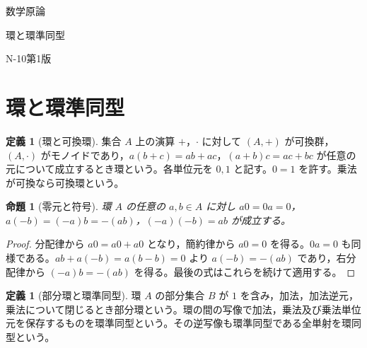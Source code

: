 \documentclass[a5paper,10pt,dvipdfmx]{jsarticle}
\theoremstyle{definition}
\newtheorem{defn}[ruledef]{定義}
\theoremstyle{plain}
\newtheorem{prop}[ruledef]{命題}
\begin{document}
\begin{center}
{\small 数学原論}\par\vspace{4mm}
{\LARGE 環と環準同型}\par\vspace{2mm}
{\small N-10\quad 第1版}
\end{center}
\section{環と環準同型}
\begin{defn}[環と可換環]\label{k249}
集合 $A$ 上の演算 $+$，$\cdot$ に対して $(A,+)$ が可換群，$(A,\cdot)$ がモノイドであり，$a(b+c)=ab+ac$，$(a+b)c=ac+bc$ が任意の元について成立するとき環という。各単位元を $0,1$ と記す。$0=1$ を許す。乗法が可換なら可換環という。
\end{defn}
\begin{prop}[零元と符号]\label{k250}
環 $A$ の任意の $a,b\in A$ に対し $a0=0a=0$，$a(-b)=(-a)b=-(ab)$，$(-a)(-b)=ab$ が成立する。
\end{prop}
\begin{proof}
分配律から $a0=a0+a0$ となり，簡約律から $a0=0$ を得る。$0a=0$ も同様である。$ab+a(-b)=a(b-b)=0$ より $a(-b)=-(ab)$ であり，右分配律から $(-a)b=-(ab)$ を得る。最後の式はこれらを続けて適用する。
\end{proof}
\begin{defn}[部分環と環準同型]\label{k251}
環 $A$ の部分集合 $B$ が $1$ を含み，加法，加法逆元，乗法について閉じるとき部分環という。環の間の写像で加法，乗法及び乗法単位元を保存するものを環準同型という。その逆写像も環準同型である全単射を環同型という。
\end{defn}
\end{document}
